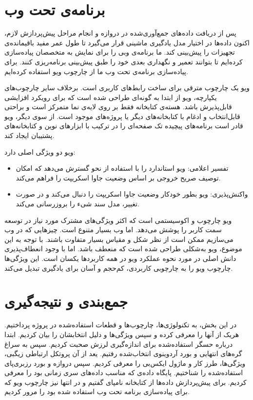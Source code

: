 \section{برنامه‌ی تحت وب}

پس از دریافت داده‌های جمع‌آوری‌شده در دروازه و انجام مراحل پیش‌پردازش لازم، اکنون داده‌ها در اختیار مدل یادگیری ماشینی قرار می‌گیرد تا طول عمر مفید باقیمانده‌ی تجهیزات را پیش‌بینی کند. ما برنامه‌ی وبی را برای نمایش به متخصصان پیاده‌سازی کرده‌ایم تا بتوانند تعمیر و نگهداری بعدی خود را طبق پیش‌بینی برنامه‌ریزی کنند. برای پیاده‌سازی برنامه‌ی تحت وب ما از چارچوب ویو استفاده کرده‌ایم.


ویو یک چارچوب مترقی برای ساخت رابط‌های کاربری است. برخلاف سایر چارچوب‌های یکپارچه، ویو از ابتدا به گونه‌ای طراحی شده است که برای رویکرد افزایشی قابل‌پذیرش باشد. هسته‌ی کتابخانه فقط بر روی لایه‌ی نما متمرکز است و براحتی قابل‌انتخاب و ادغام با کتابخانه‌های دیگر یا پروژه‌های موجود است. از سوی دیگر، ویو قادر است برنامه‌های پیچیده تک صفحه‌ای را در ترکیب با ابزارهای نوین و کتابخانه‌های پشتیبان ایجاد کند\cite{vue}.

ویو دو ویژگی اصلی دارد:
\begin{itemize}
\item تفسیر اعلامی: ویو  استاندارد را با استفاده از نحو  گسترش می‌دهد که امکان توصیف صریح خروجی  بر اساس وضعیت جاوا اسکریپت را فراهم می‌کند.
\item واکنش‌پذیری: ویو بطور خودکار وضعیت جاوا اسکریپت را دنبال می‌کند و در صورت تغییر، مدل سند شیء را بروزرسانی می‌کند.
\end{itemize}

ویو چارچوب و اکوسیستمی است که اکثر ویژگی‌های مشترک مورد نیاز در توسعه سمت کاربر را پوشش می‌دهد. اما وب بسیار متنوع است. چیزهایی که در وب می‌سازیم ممکن است از نظر شکل و مقیاس بسیار متفاوت باشند. با توجه به این موضوع، ویو به‌شکلی طراحی شده است که منعطف باشد. اما با وجود انعطاف‌پذیری دانش اصلی در مورد نحوه عملکرد ویو در همه کاربردها یکسان است\cite{vue}. این ویژگی‌ها چارچوب ویو را به چارچوبی کاربردی، کم‌حجم و آسان برای یادگیری تبدیل می‌کند.

\section{جمع‌بندی و نتیجه‌گیری}

در این بخش، به تکنولوژی‌ها، چارچوب‌ها و قطعات استفاده‌شده در پروژه پرداختیم. هریک از آنها را معرفی کرده و سپس ویژگی‌ها و دلیل انتخابشان را بیان کردیم. ابتدا درباره حسگر استفاده‌شده برای اندازه‌گیری لرزش صحبت کردیم. سپس به سراغ گره‌های انتهایی و بورد آردوینوی انتخاب‌شده رفتیم. یعد از آن پروتکل ارتباطی زیگبی، ویژگی‌ها، طرز کار و ماژول ایکس‌بی را معرفی کردیم. سپس دروازه و بورد رزبری‌پای استفاده‌شده را شناختیم. پایگاه داده‌ی  که مناسب داده‌های سری زمانی بود را معرفی کردیم. برای پیش‌پردازش داده‌ها از کتابخانه نامپای گفتیم و در انتها نیز چارچوب ویو که برای پیاده‌سازی برنامه تحت وب استفاده شده بود را مرور کردیم.